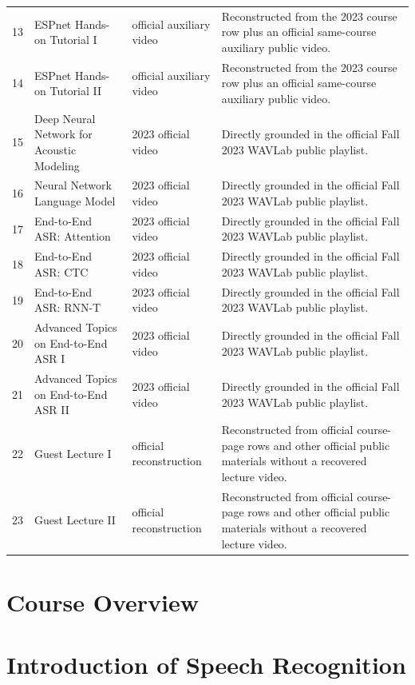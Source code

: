 \documentclass[a4paper]{article}
\begin{document}
\begin{longtable}{p{}p{}p{}p{}}
13 & ESPnet Hands-on Tutorial I & official auxiliary video & Reconstructed from the 2023 course row plus an official same-course auxiliary public video.\\
14 & ESPnet Hands-on Tutorial II & official auxiliary video & Reconstructed from the 2023 course row plus an official same-course auxiliary public video.\\
15 & Deep Neural Network for Acoustic Modeling & 2023 official video & Directly grounded in the official Fall 2023 WAVLab public playlist.\\
16 & Neural Network Language Model & 2023 official video & Directly grounded in the official Fall 2023 WAVLab public playlist.\\
17 & End-to-End ASR: Attention & 2023 official video & Directly grounded in the official Fall 2023 WAVLab public playlist.\\
18 & End-to-End ASR: CTC & 2023 official video & Directly grounded in the official Fall 2023 WAVLab public playlist.\\
19 & End-to-End ASR: RNN-T & 2023 official video & Directly grounded in the official Fall 2023 WAVLab public playlist.\\
20 & Advanced Topics on End-to-End ASR I & 2023 official video & Directly grounded in the official Fall 2023 WAVLab public playlist.\\
21 & Advanced Topics on End-to-End ASR II & 2023 official video & Directly grounded in the official Fall 2023 WAVLab public playlist.\\
22 & Guest Lecture I & official reconstruction & Reconstructed from official course-page rows and other official public materials without a recovered lecture video.\\
23 & Guest Lecture II & official reconstruction & Reconstructed from official course-page rows and other official public materials without a recovered lecture video.\\
\end{longtable}

\section{Course Overview}


\section{Introduction of Speech Recognition}

\end{document}
